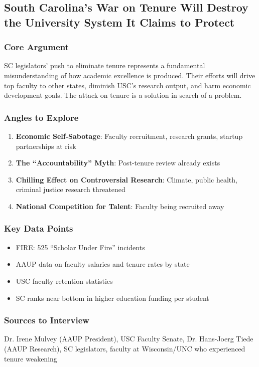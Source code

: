 \documentclass[11pt,letterpaper]{article}
\begin{document}
\subsection{South Carolina's War on Tenure Will Destroy the University System It Claims to Protect}

\subsubsection*{Core Argument}
SC legislators' push to eliminate tenure represents a fundamental misunderstanding of how academic excellence is produced. Their efforts will drive top faculty to other states, diminish USC's research output, and harm economic development goals. The attack on tenure is a solution in search of a problem.

\subsubsection*{Angles to Explore}
\begin{enumerate}[noitemsep]
    \item \textbf{Economic Self-Sabotage}: Faculty recruitment, research grants, startup partnerships at risk
    \item \textbf{The ``Accountability'' Myth}: Post-tenure review already exists
    \item \textbf{Chilling Effect on Controversial Research}: Climate, public health, criminal justice research threatened
    \item \textbf{National Competition for Talent}: Faculty being recruited away
\end{enumerate}

\subsubsection*{Key Data Points}
\begin{itemize}[noitemsep]
    \item FIRE: 525 ``Scholar Under Fire'' incidents
    \item AAUP data on faculty salaries and tenure rates by state
    \item USC faculty retention statistics
    \item SC ranks near bottom in higher education funding per student
\end{itemize}

\subsubsection*{Sources to Interview}
Dr. Irene Mulvey (AAUP President), USC Faculty Senate, Dr. Hans-Joerg Tiede (AAUP Research), SC legislators, faculty at Wisconsin/UNC who experienced tenure weakening
\end{document}
